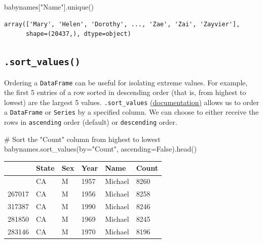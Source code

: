 \documentclass[
  letterpaper,
  DIV=11,
  numbers=noendperiod]{scrreprt}
\newenvironment{Shaded}{\begin{snugshade}}{\end{snugshade}}
\newcommand{\CommentTok}[1]{\textcolor[rgb]{0.37,0.37,0.37}{#1}}
\newcommand{\NormalTok}[1]{\textcolor[rgb]{0.00,0.23,0.31}{#1}}
\newcommand{\OperatorTok}[1]{\textcolor[rgb]{0.37,0.37,0.37}{#1}}
\newcommand{\StringTok}[1]{\textcolor[rgb]{0.13,0.47,0.30}{#1}}
\newcommand{\VariableTok}[1]{\textcolor[rgb]{0.07,0.07,0.07}{#1}}
\begin{document}
\begin{Shaded}
\begin{Highlighting}[]
\NormalTok{babynames[}\StringTok{"Name"}\NormalTok{].unique()}
\end{Highlighting}
\end{Shaded}

\begin{verbatim}
array(['Mary', 'Helen', 'Dorothy', ..., 'Zae', 'Zai', 'Zayvier'],
      shape=(20437,), dtype=object)
\end{verbatim}

\subsection{\texorpdfstring{\texttt{.sort\_values()}}{.sort\_values()}}\label{sort_values}

Ordering a \texttt{DataFrame} can be useful for isolating extreme
values. For example, the first 5 entries of a row sorted in descending
order (that is, from highest to lowest) are the largest 5 values.
\texttt{.sort\_values}
\href{https://pandas.pydata.org/docs/reference/api/pandas.DataFrame.sort_values.html}{(documentation)}
allows us to order a \texttt{DataFrame} or \texttt{Series} by a
specified column. We can choose to either receive the rows in
\texttt{ascending} order (default) or \texttt{descending} order.

\begin{Shaded}
\begin{Highlighting}[]
\CommentTok{\# Sort the "Count" column from highest to lowest}
\NormalTok{babynames.sort\_values(by}\OperatorTok{=}\StringTok{"Count"}\NormalTok{, ascending}\OperatorTok{=}\VariableTok{False}\NormalTok{).head()}
\end{Highlighting}
\end{Shaded}

\begin{longtable}[]{@{}llllll@{}}
\toprule\noalign{}
& State & Sex & Year & Name & Count \\
\midrule\noalign{}
\endhead
\bottomrule\noalign{}
\endlastfoot
268041 & CA & M & 1957 & Michael & 8260 \\
267017 & CA & M & 1956 & Michael & 8258 \\
317387 & CA & M & 1990 & Michael & 8246 \\
281850 & CA & M & 1969 & Michael & 8245 \\
283146 & CA & M & 1970 & Michael & 8196 \\
\end{longtable}
\end{document}
